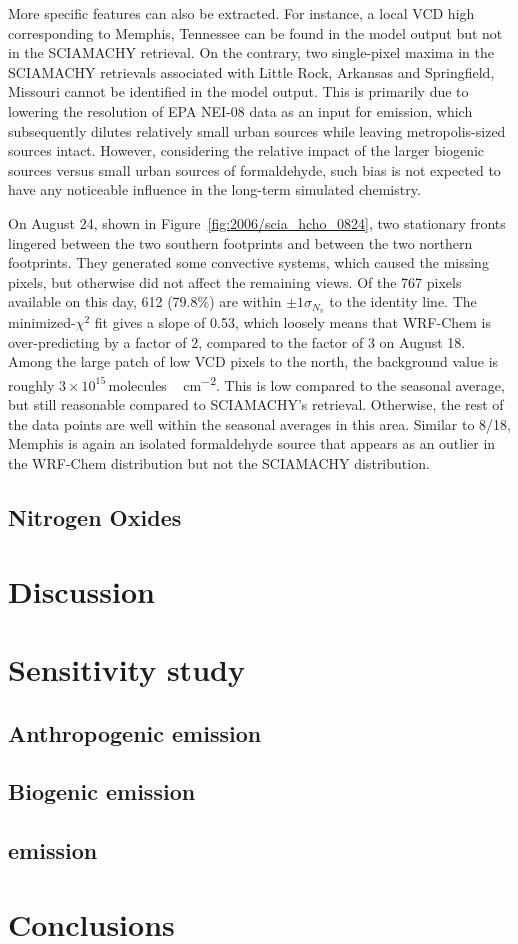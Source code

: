 More specific features can also be extracted. For instance, a  local VCD high corresponding to Memphis, Tennessee can be found in the model output but not in the
SCIAMACHY retrieval. On the contrary, two single-pixel maxima in the SCIAMACHY retrievals associated with Little Rock, Arkansas and Springfield, Missouri cannot be identified
in the model output. This is primarily due to lowering the resolution of EPA NEI-08 data as an input for emission, which subsequently dilutes relatively small urban sources while
leaving metropolis-sized sources intact. However, considering the relative impact of the larger biogenic sources versus small urban sources of formaldehyde, such bias is not expected
to have any noticeable influence in the long-term simulated chemistry.

On August 24, shown in Figure~\ref{fig:2006/scia_hcho_0824}, two stationary fronts lingered between the two southern footprints and between the two northern footprints. They generated
some convective systems, which caused the missing pixels, but otherwise did not affect the remaining views. Of the 767 pixels available on this day, 612 (79.8\%) are within $\pm1\sigma_{N_v}$
to the identity line. The minimized-$\chi^2$ fit gives a slope of 0.53, which loosely means that WRF-Chem is over-predicting by a factor of 2, compared to the factor of 3 on August 18.
Among the large patch of low VCD pixels to the north, the background value is roughly $3\times10^{15}$\,\unit{molecules\,cm^{-2}}. This is low compared to the \citet{Millet:2008oq}
seasonal average, but still reasonable compared to SCIAMACHY's retrieval. Otherwise, the rest of the data points are well within the seasonal averages in this area. Similar to 8/18,
Memphis is again an isolated formaldehyde source that appears as an outlier in the WRF-Chem distribution but not the SCIAMACHY distribution.

\subsection{Nitrogen Oxides}\label{ssec:2006/gen/nox}

\section{Discussion}\label{sec:2006/discussion}

\section{Sensitivity study}\label{sec:2006/sens}
\subsection{Anthropogenic emission}\label{ssec:2006/sens/anthrop}
\subsection{Biogenic emission}\label{ssec:2006/sens/bio}
\subsection{{\lnox} emission}\label{ssec:2006/sens/lnox}

\section{Conclusions}\label{sec:2006/conslusion}